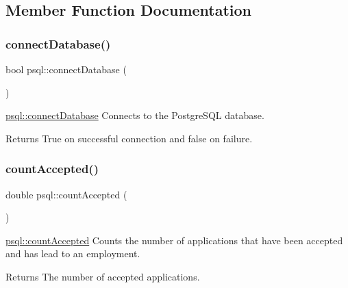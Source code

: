 \subsection{Member Function Documentation}
\mbox{\label{classpsql_ada485c933df77453629e3821ab19fa4c}} 
\subsubsection{\texorpdfstring{connectDatabase()}{connectDatabase()}}
{\footnotesize\ttfamily bool psql\+::connect\+Database (\begin{DoxyParamCaption}{ }\end{DoxyParamCaption})}



\mbox{\hyperlink{classpsql_ada485c933df77453629e3821ab19fa4c}{psql\+::connect\+Database}} Connects to the Postgre\+S\+QL database. 

\begin{DoxyReturn}{Returns}
True on successful connection and false on failure. 
\end{DoxyReturn}
\mbox{\label{classpsql_a0beec2f098edc0961f27774cdd54d09b}} 
\subsubsection{\texorpdfstring{countAccepted()}{countAccepted()}}
{\footnotesize\ttfamily double psql\+::count\+Accepted (\begin{DoxyParamCaption}{ }\end{DoxyParamCaption})}



\mbox{\hyperlink{classpsql_a0beec2f098edc0961f27774cdd54d09b}{psql\+::count\+Accepted}} Counts the number of applications that have been accepted and has lead to an employment. 

\begin{DoxyReturn}{Returns}
The number of accepted applications. 
\end{DoxyReturn}
\mbox{\label{classpsql_a2ae512bc231446d5fccae84582395675}} 

